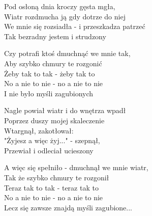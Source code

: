 \begin{text}
    Pod osłoną dnia kroczy gęsta mgła,\\
    Wiatr rozdmucha ją gdy dotrze do niej\\
    We mnie się rozsiadła - i przeszkadza patrzeć\\
    Tak bezradny jestem i strudzony

    Czy potrafi ktoś dmuchnąć we mnie tak,\\
    Aby szybko chmury te rozgonić\\
    Żeby tak to tak - żeby tak to\\
    No a nie to nie - no a nie to nie\\
    I nie było myśli zagubionych

    Nagle powiał wiatr i do wnętrza wpadł\\
    Poprzez duszy mojej skaleczenie\\
    Wtargnął, zakotłował:\\
    "Żyjesz a więc żyj..." - szepnął,\\
    Przewiał i odleciał ucieszony

    A więc się spełniło - dmuchnął we mnie wiatr,\\
    Tak że szybko chmury te rozgonił\\
    Teraz tak to tak - teraz tak to\\
    No a nie to nie - no a nie to nie\\
    Lecz się zawsze znajdą myśli zagubione...
\end{text}
\begin{chord}

\end{chord}